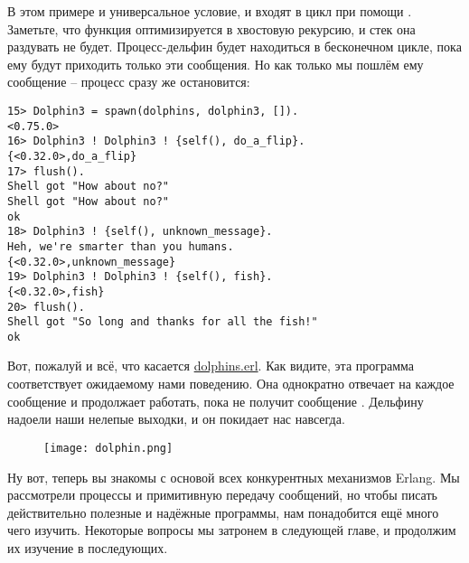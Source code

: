 В этом примере и универсальное условие, и  входят в цикл при помощи .
Заметьте, что функция оптимизируется в хвостовую рекурсию, и стек она раздувать не будет.
Процесс\--дельфин будет находиться в бесконечном цикле, пока ему будут приходить только эти сообщения. 
Но как только мы пошлём ему сообщение \--- процесс сразу же остановится:
\begin{lstlisting}[style=erlang]
15> Dolphin3 = spawn(dolphins, dolphin3, []).
<0.75.0>
16> Dolphin3 ! Dolphin3 ! {self(), do_a_flip}.
{<0.32.0>,do_a_flip}
17> flush().
Shell got "How about no?"
Shell got "How about no?"
ok
18> Dolphin3 ! {self(), unknown_message}.    
Heh, we're smarter than you humans.
{<0.32.0>,unknown_message}
19> Dolphin3 ! Dolphin3 ! {self(), fish}.
{<0.32.0>,fish}
20> flush().
Shell got "So long and thanks for all the fish!"
ok
\end{lstlisting}

Вот, пожалуй и всё, что касается \href{http://learnyousomeerlang.com/static/erlang/dolphins.erl}{dolphins.erl}.
Как видите, эта программа соответствует ожидаемому нами поведению.
Она однократно отвечает на каждое сообщение и продолжает работать, пока не получит сообщение .
Дельфину надоели наши нелепые выходки, и он покидает нас навсегда.
\begin{figure}[h!]
    \centering
    \texttt{[image: dolphin.png]}
\end{figure}

Ну вот, теперь вы знакомы с основой всех конкурентных механизмов Erlang.
Мы рассмотрели процессы и примитивную передачу сообщений, но чтобы писать действительно полезные и надёжные программы, нам понадобится ещё много чего изучить.
Некоторые вопросы мы затронем в следующей главе, и продолжим их изучение в последующих.
